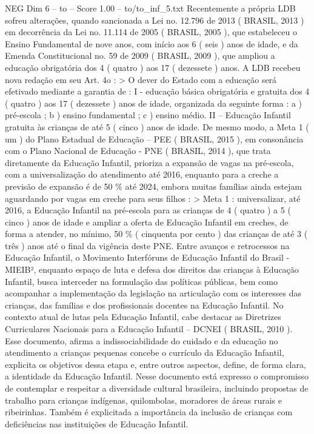 \begin{textsample}{NEG Dim 6 – to – Score 1.00 – to/to\_inf\_5.txt}
Recentemente a própria LDB sofreu alterações, quando sancionada a Lei no. 12.796 de 2013 ( BRASIL, 2013 ) em decorrência da Lei no. 11.114 de 2005 ( BRASIL, 2005 ), que estabeleceu o Ensino Fundamental de nove anos, com início aos 6 ( seis ) anos de idade, e da Emenda Constitucional no. 59 de 2009 ( BRASIL, 2009 ), que ampliou a educação obrigatória dos 4 ( quatro ) aos 17 ( dezessete ) anos.
A LDB recebeu nova redação em seu Art. 4o : > O dever do Estado com a educação será efetivado mediante a garantia de : I - educação básica obrigatória e gratuita dos 4 ( quatro ) aos 17 ( dezessete ) anos de idade, organizada da seguinte forma : a ) pré-escola ; b ) ensino fundamental ; c ) ensino médio.
II – Educação Infantil gratuita às crianças de até 5 ( cinco ) anos de idade.
De mesmo modo, a Meta 1 ( um ) do Plano Estadual de Educação – PEE ( BRASIL, 2015 ), em consonância com o Plano Nacional de Educação - PNE ( BRASIL, 2014 ), que trata diretamente da Educação Infantil, prioriza a expansão de vagas na pré-escola, com a universalização do atendimento até 2016, enquanto para a creche a previsão de expansão é de 50 \% até 2024, embora muitas famílias ainda estejam aguardando por vagas em creche para seus filhos : > Meta 1 : universalizar, até 2016, a Educação Infantil na pré-escola para as crianças de 4 ( quatro ) a 5 ( cinco ) anos de idade e ampliar a oferta de Educação Infantil em creches, de forma a atender, no mínimo, 50 \% ( cinquenta por cento ) das crianças de até 3 ( três ) anos até o final da vigência deste PNE.
Entre avanços e retrocessos na Educação Infantil, o Movimento Interfóruns de Educação Infantil do Brasil - MIEIB², enquanto espaço de luta e defesa dos direitos das crianças à Educação Infantil, busca interceder na formulação das políticas públicas, bem como acompanhar a implementação da legislação na articulação com os interesses das crianças, das famílias e dos profissionais docentes na Educação Infantil.
No contexto atual de lutas pela Educação Infantil, cabe destacar as Diretrizes Curriculares Nacionais para a Educação Infantil – DCNEI ( BRASIL, 2010 ).
Esse documento, afirma a indissociabilidade do cuidado e da educação no atendimento a crianças pequenas concebe o currículo da Educação Infantil, explicita os objetivos dessa etapa e, entre outros aspectos, define, de forma clara, a identidade da Educação Infantil.
Nesse documento está expresso o compromisso de contemplar e respeitar a diversidade cultural brasileira, incluindo propostas de trabalho para crianças indígenas, quilombolas, moradores de áreas rurais e ribeirinhas.
Também é explicitada a importância da inclusão de crianças com deficiências nas instituições de Educação Infantil.

\end{textsample}
